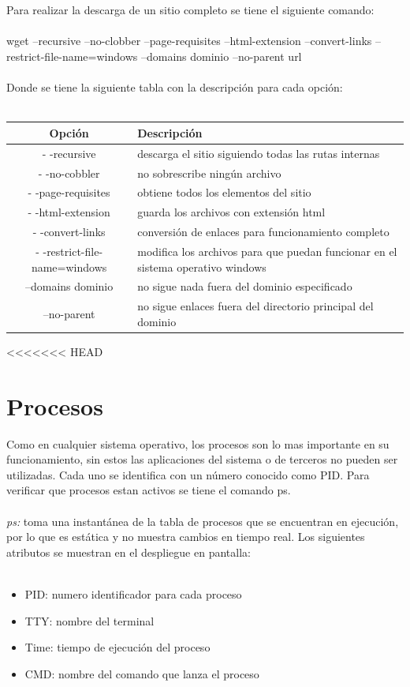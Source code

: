 \documentclass[10pt,a4paper,titlepage]{article}
\begin{document}
	\\
	\\
	Para realizar la descarga de un sitio completo se tiene el siguiente comando:
	\\
	\\
	wget --recursive --no-clobber --page-requisites --html-extension --convert-links --restrict-file-name=windows --domains dominio --no-parent url
	\\
	\\
	Donde se tiene la siguiente tabla con la descripción para cada opción:
	\\
	\\
	\begin{tabular}{|c|p{8cm}|}
		\hline
		Opción & Descripción \\
		\hline
		- -recursive & descarga el sitio siguiendo todas las rutas internas \\
		\hline
		- -no-cobbler & no sobrescribe ningún archivo \\
		\hline 
		- -page-requisites & obtiene todos los elementos del sitio \\
		\hline
		- -html-extension & guarda los archivos con extensión html \\
		\hline
		- -convert-links & conversión de enlaces para funcionamiento completo \\
		\hline
		- -restrict-file-name=windows & modifica los archivos para que puedan funcionar en el sistema operativo windows \\
		\hline
		--domains dominio & no sigue nada fuera del dominio especificado \\
		\hline
		--no-parent & no sigue enlaces fuera del directorio principal del dominio \\
		\hline
	\end{tabular}
	
<<<<<<< HEAD
	\section*{Procesos}
	Como en cualquier sistema operativo, los procesos son lo mas importante en su funcionamiento, sin estos las aplicaciones del sistema o de terceros no pueden ser utilizadas. Cada uno se identifica con un número conocido como PID. Para verificar que procesos estan activos se tiene el comando ps.
	\\
	\\
	\emph{ps:} toma una instantánea de la tabla de procesos que se encuentran en ejecución, por lo que es estática y no muestra cambios en tiempo real. Los siguientes atributos se muestran en el despliegue en pantalla:
	\\
	\\
	\begin{itemize}
		\item PID: numero identificador para cada proceso
		\item TTY: nombre del terminal
		\item Time: tiempo de ejecución del proceso
		\item CMD: nombre del comando que lanza el proceso 
	\end{itemize}
\end{document}
